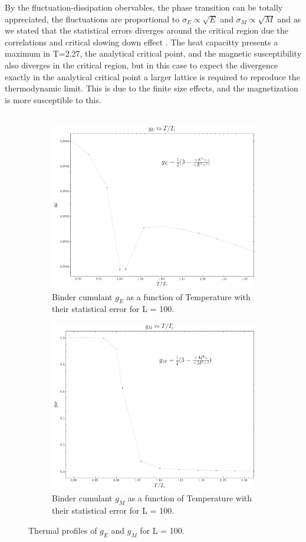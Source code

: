 \documentclass[article]{revtex4}
\begin{document}
By the fluctuation-dissipation obervables, the phase transition can be totally appreciated, the fluctuations are proportional to $\sigma_E \propto \sqrt{E}$ and $\sigma_M \propto \sqrt{M}$ and as we stated that the statistical errors diverges around the critical region due the correlations and critical slowing down effect . The heat capacitty presents a maximum in T=2.27, the analytical critical point, and the magnetic susceptibility also diverges in the critical region, but in this case to expect the divergence exactly in the analytical critical point a larger lattice is required to reproduce the thermodynamic limit. This is due to the finite size effects, and the magnetization is more susceptible to this.
\\
\\
\begin{figure}[h!]
\begin{subfigure}{.5\textwidth}
  \centering
  \includegraphics[width=0.7\linewidth]{binderE_vs_T.png}
  \caption{Binder cumulant $g_E$ as a function of Temperature with their statistical error for L = 100.}
\end{subfigure}%
\begin{subfigure}{.5\textwidth}
  \centering
  \includegraphics[width=0.7\linewidth]{binder_vs_T.png}
  \caption{Binder cumulant $g_M$ as a function of Temperature with their statistical error for L = 100.}
\end{subfigure}
\caption{Thermal profiles of $g_E$ and $g_M$ for L = 100.}
\end{figure}
\end{document}
